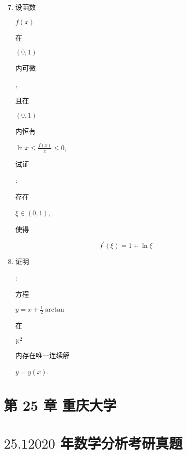 \documentclass[10pt]{article}
\begin{document}
\begin{enumerate}
  \setcounter{enumi}{6}
  \item \begin{CJK}{UTF8}{mj}设函数\end{CJK} $f(x)$ \begin{CJK}{UTF8}{mj}在\end{CJK} $(0,1)$ \begin{CJK}{UTF8}{mj}内可微\end{CJK}, \begin{CJK}{UTF8}{mj}且在\end{CJK} $(0,1)$ \begin{CJK}{UTF8}{mj}内恒有\end{CJK} $\ln x \leq \frac{f(x)}{x} \leq 0$, \begin{CJK}{UTF8}{mj}试证\end{CJK}: \begin{CJK}{UTF8}{mj}存在\end{CJK} $\xi \in(0,1)$, \begin{CJK}{UTF8}{mj}使得\end{CJK}
\end{enumerate}
$$
f^{\prime}(\xi)=1+\ln \xi
$$

\begin{enumerate}
  \setcounter{enumi}{7}
  \item \begin{CJK}{UTF8}{mj}证明\end{CJK}: \begin{CJK}{UTF8}{mj}方程\end{CJK} $y=x+\frac{1}{2} \arctan$ \begin{CJK}{UTF8}{mj}在\end{CJK} $\mathbb{R}^{2}$ \begin{CJK}{UTF8}{mj}内存在唯一连续解\end{CJK} $y=y(x)$.
\end{enumerate}
\section{第 25 章 重庆大学}
\section{$25.12020$ 年数学分析考研真题}
\end{document}
